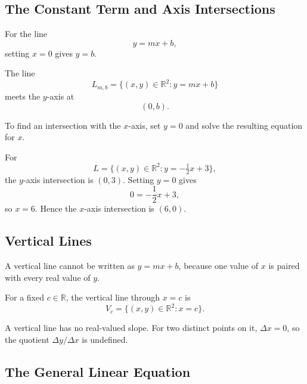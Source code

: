 \subsection{The Constant Term and Axis Intersections}

For the line
\[
y=mx+b,
\]
setting $x=0$ gives $y=b$.

\begin{theorembox}
The line
\[
L_{m,b}=\{(x,y)\in\mathbb{R}^2:y=mx+b\}
\]
meets the $y$-axis at
\[
\boxed{(0,b)}.
\]
\end{theorembox}

To find an intersection with the $x$-axis, set $y=0$ and solve the resulting
equation for $x$.

\begin{examplebox}
For
\[
L=\{(x,y)\in\mathbb{R}^2:y=-\tfrac12x+3\},
\]
the $y$-axis intersection is $(0,3)$. Setting $y=0$ gives
\[
0=-\frac12x+3,
\]
so $x=6$. Hence the $x$-axis intersection is $(6,0)$.
\end{examplebox}

\subsection{Vertical Lines}

A vertical line cannot be written as $y=mx+b$, because one value of $x$ is
paired with every real value of $y$.

\begin{definitionbox}
For a fixed $c\in\mathbb{R}$, the vertical line through $x=c$ is
\[
V_c=\{(x,y)\in\mathbb{R}^2:x=c\}.
\]
\end{definitionbox}

\begin{center}
\end{center}

\begin{remarkbox}
A vertical line has no real-valued slope. For two distinct points on it,
$\Delta x=0$, so the quotient $\Delta y/\Delta x$ is undefined.
\end{remarkbox}

\subsection{The General Linear Equation}

